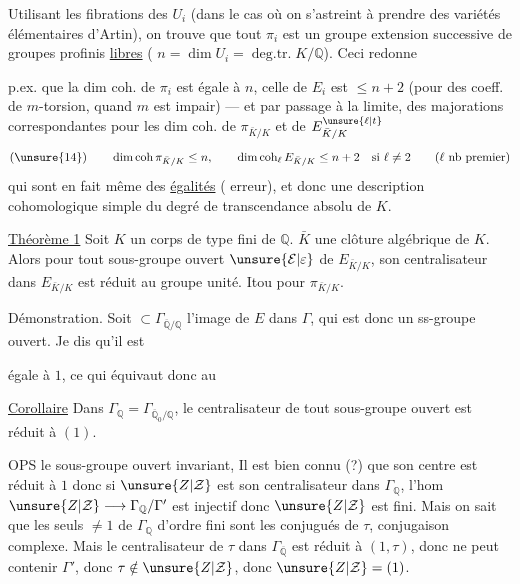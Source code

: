 Utilisant les fibrations des $U_i$ (dans le cas où on s'astreint à prendre des variétés élémentaires d'Artin), on trouve que tout $\pi_i$ est un groupe  extension successive de  groupes profinis \uline{libres} ( $n=\dim U_i=\operatorname{deg.tr.}K/\mathbb Q$). Ceci redonne

p.ex. que la dim coh. de $\pi_i$ est égale à $n$, celle de $E_i$ est $\leq n+2$ (pour des coeff.  de $m$-torsion, quand $m$ est impair) --- et par passage à la limite, des majorations correspondantes pour les dim coh. de $\pi_{\bar K/K}$ et de $E_{\bar K/K}^{\unsure{\ell|t}}$
\[
(\unsure{14})\qquad \dim\operatorname{coh}\pi_{\bar K/K}\leq n,\qquad
\dim\operatorname{coh}_{\ell}E_{\bar K/K}\leq n+2\quad\text{si }\ell\neq2
\qquad(\ell\text{ nb premier})
\]
qui sont en fait même des \uline{égalités} ( erreur), et  donc une description cohomologique simple du degré de transcendance absolu de $K$.

\uline{Théorème 1} Soit $K$ un corps  de type fini de $\mathbb Q$.  $\bar K$ une clôture algébrique de $K$. Alors pour tout sous-groupe ouvert $\unsure{\mathcal E|\varepsilon}$ de $E_{\bar K/K}$, son centralisateur dans $E_{\bar K/K}$ est réduit au groupe unité. Itou pour $\pi_{\bar K/K}$.

Démonstration. Soit $\subset\Gamma_{\overline{\mathbb Q}/\mathbb Q}$ l'image de $E$ dans $\Gamma$, qui est donc un ss-groupe ouvert.   Je dis qu'il est

égale à $1$, ce qui équivaut donc au

\uline{Corollaire} Dans $\Gamma_{\mathbb Q}=\Gamma_{\overline{\mathbb Q}_0/\mathbb Q}$, le centralisateur de tout sous-groupe ouvert est réduit à $(1)$.

OPS le sous-groupe ouvert  invariant, Il est bien connu (?) que son centre est réduit à $1$
donc si $\unsure{Z|\mathcal Z}$ est son centralisateur dans $\Gamma_{\mathbb Q}$, l'hom $\unsure{Z|\mathcal Z}\longrightarrow\Gamma_{\mathbb Q}/\Gamma'$ est injectif donc $\unsure{Z|\mathcal Z}$ est fini. Mais on sait que les seuls  $\neq1$ de $\Gamma_{\mathbb Q}$ d'ordre fini sont les conjugués de $\tau$, conjugaison complexe. Mais le centralisateur de $\tau$ dans $\Gamma_{\overline{\mathbb Q}}$ est réduit à $(1,\tau)$, donc ne peut contenir $\Gamma'$, donc $\tau\notin\unsure{Z|\mathcal Z}$, donc $\unsure{Z|\mathcal Z}=(1)$.

